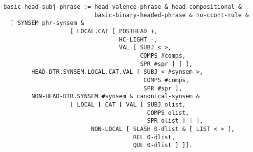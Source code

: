 \documentclass[a4paper]{article}
\begin{document}
{\small\begin{verbatim}
basic-head-subj-phrase := head-valence-phrase & head-compositional & 
                          basic-binary-headed-phrase & no-ccont-rule &
  [ SYNSEM phr-synsem & 
                   [ LOCAL.CAT [ POSTHEAD +,
                                 HC-LIGHT -,
                                 VAL [ SUBJ < >,
                                       COMPS #comps,
                                       SPR #spr ] ] ],
        HEAD-DTR.SYNSEM.LOCAL.CAT.VAL [ SUBJ < #synsem >,
                                        COMPS #comps,        
                                        SPR #spr ],
        NON-HEAD-DTR.SYNSEM #synsem & canonical-synsem &
                   [ LOCAL [ CAT [ VAL [ SUBJ olist,
                                         COMPS olist,
                                         SPR olist ] ] ],
                         NON-LOCAL [ SLASH 0-dlist & [ LIST < > ],
                                     REL 0-dlist,
                                     QUE 0-dlist ] ]].
\end{verbatim}}
\end{document}
